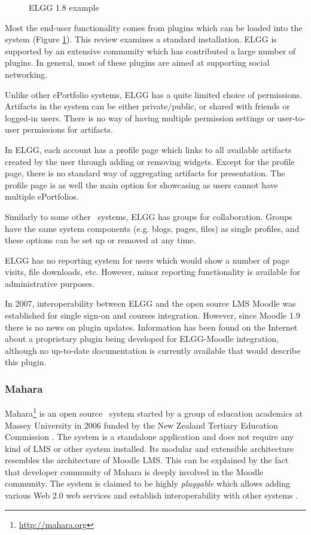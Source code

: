 \begin{figure}[htb]
\centering
\setlength\fboxsep{0pt}
\setlength\fboxrule{0.5pt}
\caption{ELGG 1.8 example}
\label{fig:elgg}
\end{figure}

Most the end-user functionality comes from plugins which can be loaded into the
system (Figure \ref{fig:elgg}). This review examines a standard installation.
ELGG is supported by an extensive community which has contributed a large number of plugins. In
general, most of these plugins are aimed at supporting social networking.

Unlike other ePortfolio systems, ELGG has a quite limited choice of permissions.
Artifacts in the system can be either private/public, or shared with friends
or logged-in users. There is no way of having multiple permission settings or
user-to-user permissions for artifacts.

In ELGG, each account has a profile page which links to
all available artifacts created by the user through adding or removing widgets.
Except for the profile page, there is no standard way of aggregating artifacts
for presentation. The profile page is as well the main option for showcasing as
users cannot have multiple ePortfolios.

Similarly to some other \ep~systems, ELGG has groups for collaboration. Groups
have the same system components (e.g. blogs, pages, files) as single profiles,
and these options can be set up or removed at any time.

ELGG has no reporting system for users which would show a number of page
visits, file downloads, etc. However, minor reporting functionality is available
for administrative purposes.

In 2007, interoperability between ELGG and the open source LMS Moodle was
established for single sign-on and courses integration. However, since Moodle
1.9 there is no news on plugin updates. Information has been found on the
Internet about a proprietary plugin being developed for ELGG-Moodle integration,
although no up-to-date documentation is currently available that would describe
this plugin.
 
\subsubsection{Mahara}
Mahara\footnote{\url{http://mahara.org}} is an open source \ep~system started by
a group of education academics at Massey University in 2006 funded by the New
Zealand Tertiary Education Commission \citep{Brown2007}. The system is a
standalone application and does not require any kind of LMS or other system
installed. Its modular and extensible architecture resembles the architecture of
Moodle LMS. This can be explained by the fact that developer community of Mahara
is deeply involved in the Moodle community. The system is claimed to be highly
\textit{pluggable} which allows adding various Web 2.0 web services and
establish interoperability with other systems \citep{MaharaGovernanceGroup2011}.


